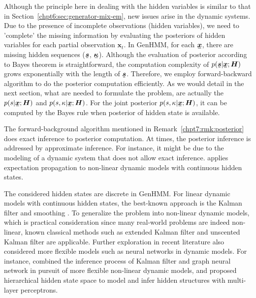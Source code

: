 \begin{remark}[On posterior]\label{chpt7:rmk:posterior}
  Although the principle here in dealing with the hidden variables is similar to that in Section~\ref{chpt6:sec:generator-mix-em}, new issues arise in the dynamic systems. Due to the presence of incomplete observations (hidden variables), we need to 'complete' the missing information by evaluating the posteriors of hidden variables for each partial observation $\bm{x}_t$. In GenHMM, for each $\ubm{x}$, there are missing hidden sequences ($\ubm{s}$, $\ubm{\kappa}$). Although the evaluation of posterior according to Bayes theorem is straightforward, the computation complexity of $p(\ubm{s}| \ubm{x}; \bm{H})$ grows exponentially with the length of $\ubm{s}$. Therefore, we employ forward-backward algorithm \cite{Bishop:2006:PRM:1162264} to do the posterior computation efficiently. As we would detail in the next section, what are needed to formulate the problem, are actually the $p(s| \ubm{x}; \bm{H})$ and $p(s, \kappa| \ubm{x}; \bm{H})$. For the joint posterior $p(s, \kappa| \ubm{x}; \bm{H})$, it can be computed by the Bayes rule when posterior of hidden state is available.
\end{remark}
\begin{remark}\label{chpt7:rmk:connections}
  The forward-background algorithm mentioned in Remark~\ref{chpt7:rmk:posterior} does exact inference to posterior computation. At times, the posterior inference is addressed by approximate inference. For instance, it might be due to the modeling of a dynamic system that does not allow exact inference. \cite{yuan2007thesis} applies expectation propagation \cite{Minka:2001:EPA:647235.720257} to non-linear dynamic models with continuous hidden states.
  
  The considered hidden states are discrete in GenHMM. For linear dynamic models with continuous hidden states, the best-known approach is the Kalman filter \cite{kalman1960} and smoothing \cite{rauch1965}. To generalize the problem into non-linear dynamic models, which is practical consideration since many real-world problems are indeed non-linear, known classical methods such as extended Kalman filter \cite{ljung1979} and unscented Kalman filter \cite{wan2000unscented} are applicable. Further exploration in recent literature also considered more flexible models such as neural networks in dynamic models. For instance, \cite{wallach2019hybrid} combined the inference process of Kalman filter and graph neural network in pursuit of more flexible non-linear dynamic models, and \cite{kim2019variational} proposed hierarchical hidden state space to model and infer hidden structures with multi-layer perceptrons.
\end{remark}


